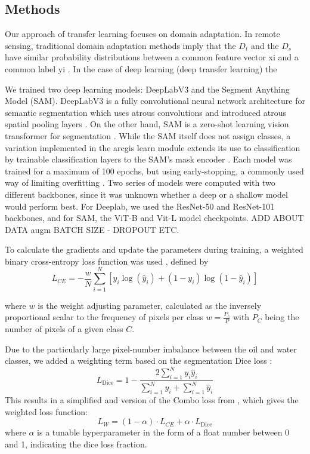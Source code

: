 \documentclass[journal]{IEEEtran}
\begin{document}
\subsection{Methods}
Our approach of transfer learning focuses on domain adaptation. In remote sensing, traditional domain adaptation methods imply that the $\mathit{D}_t$ and the $\mathit{D}_s$ have similar probability distributions 
between a common feature vector xi and a common label yi \cite{tuiaDomainAdaptationClassification2016}. In the case of deep learning (deep transfer learning) the 

We trained two deep learning models: DeepLabV3 and the Segment Anything Model (SAM). DeepLabV3 is a fully convolutional neural network architecture for semantic segmentation which uses atrous convolutions 
and introduced atrous spatial pooling layers \cite{chenDeepLabSemanticImage2018}. On the other hand, SAM is a zero-shot learning vision transformer for segmentation \cite{kirillovSegmentAnything2023}. 
While the SAM itself does not assign classes, a variation implemented in the arcgis learn module extends its use to classification by trainable classification layers to the SAM's mask encoder 
\cite{esrideveloperFinetuneSegmentAnything2025}. Each model was trained for a maximum of 100 epochs, but using early-stopping, a commonly used way of limiting overfitting \cite{wangGeneralizingFewExamples2020}.
Two series of models were computed with two different backbones, since it was unknown whether a deep or a shallow model would perform best. For Deeplab, we used the ResNet-50 and ResNet-101 backbones, and for SAM, 
the ViT-B and Vit-L model checkpoints. ADD ABOUT DATA augm BATCH SIZE - DROPOUT ETC.

To calculate the gradients and update the parameters during training, a weighted binary cross-entropy loss function was used , defined by
\[
    L_\textit{CE} = -\frac{w}{N} \sum_{i=1}^{N} \left[ y_i \log(\hat{y}_i) + (1 - y_i) \log(1 - \hat{y}_i) \right]
\]

where \( w \) is the weight adjusting parameter, calculated as the inversely proportional scalar to the frequency of pixels per class \( w = \frac{P_c}{P} \) with \( P_C \) being the number of pixels 
of a given class \( C \).

Due to the particularly large pixel-number imbalance between the oil and water classes, we added a weighting term based on the segmentation Dice loss \cite{milletariVNetFullyConvolutional2016}:
\[
    L_\text{Dice} = 1 - \frac{2 \sum_{i=1}^{N} y_i \hat{y}_i}{\sum_{i=1}^{N} y_i + \sum_{i=1}^{N} \hat{y}_i}
\]
This results in a simplified and version of the Combo loss from \cite{taghanakiComboLossHandling2019}, which gives the weighted loss function:
\[
    L_W = (1 - \alpha) \cdot L_\textit{CE} + \alpha \cdot L_\text{Dice}
\]
where $\alpha$ is a tunable hyperparameter in the form of a float number between 0 and 1, indicating the dice loss fraction. 
\end{document}
